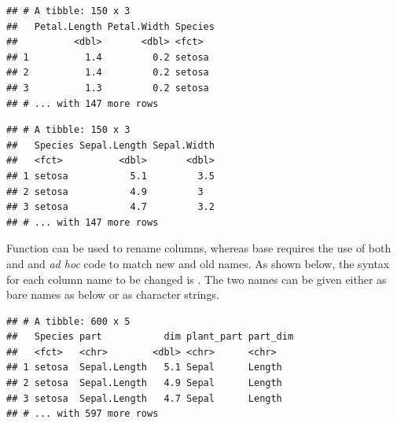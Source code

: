 \documentclass[krantz2]{krantz}\usepackage{knitr}
\begin{document}
\begin{knitrout}\footnotesize
{}\color{fgcolor}\begin{kframe}
\begin{alltt}
 \hlopt{-}\hlstd{(}\hlstd{))}
\end{alltt}
\begin{verbatim}
## # A tibble: 150 x 3
##   Petal.Length Petal.Width Species
##          <dbl>       <dbl> <fct>  
## 1          1.4         0.2 setosa 
## 2          1.4         0.2 setosa 
## 3          1.3         0.2 setosa 
## # ... with 147 more rows
\end{verbatim}
\end{kframe}
\end{knitrout}

\begin{knitrout}\footnotesize
{}\color{fgcolor}\begin{kframe}
\begin{alltt}
 \hlstd{(}\hlstd{))}
\end{alltt}
\begin{verbatim}
## # A tibble: 150 x 3
##   Species Sepal.Length Sepal.Width
##   <fct>          <dbl>       <dbl>
## 1 setosa           5.1         3.5
## 2 setosa           4.9         3  
## 3 setosa           4.7         3.2
## # ... with 147 more rows
\end{verbatim}
\end{kframe}
\end{knitrout}

Function  can be used to rename columns, whereas base \Rlang requires the use of both  and  and \emph{ad hoc} code to match new and old names. As shown below, the syntax for each column name to be changed is . The two names can be given either as bare names as below or as character strings.

\begin{knitrout}\footnotesize
{}\color{fgcolor}\begin{kframe}
\begin{alltt}
  
\end{alltt}
\begin{verbatim}
## # A tibble: 600 x 5
##   Species part           dim plant_part part_dim
##   <fct>   <chr>        <dbl> <chr>      <chr>   
## 1 setosa  Sepal.Length   5.1 Sepal      Length  
## 2 setosa  Sepal.Length   4.9 Sepal      Length  
## 3 setosa  Sepal.Length   4.7 Sepal      Length  
## # ... with 597 more rows
\end{verbatim}
\end{kframe}
\end{knitrout}
\end{document}
